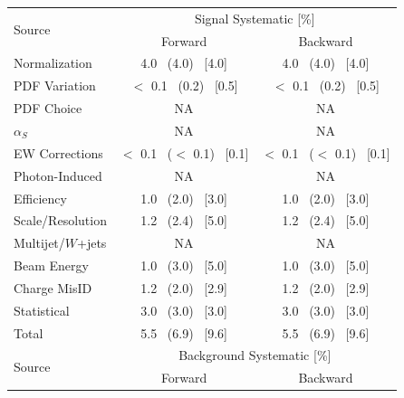     \begin {table}[h]
        \begin{center}
        \begin{tabular}{ | l | c c | } 
            \hline
            \multirow{2}{*}{Source} & \multicolumn{2}{c|}{Signal Systematic [\%]}               \\
                                & Forward                           & Backward                        \\
            \hline
            Normalization       & 4.0 ~(4.0) ~[4.0]           & 4.0 ~(4.0) ~[4.0]         \\
            PDF Variation       & $<$ 0.1 ~(0.2) ~[0.5]       & $<$ 0.1 ~(0.2) ~[0.5]     \\
            PDF Choice          & NA                                & NA                              \\
            $\alpha_S$          & NA                                & NA                              \\
            EW Corrections      & $<$ 0.1 ~($<$ 0.1) ~[0.1]   & $<$ 0.1 ~($<$ 0.1) ~[0.1] \\
            Photon-Induced      & NA                                & NA                              \\
            Efficiency          & 1.0 ~(2.0) ~[3.0]           & 1.0 ~(2.0) ~[3.0]         \\
            Scale/Resolution    & 1.2 ~(2.4) ~[5.0]           & 1.2 ~(2.4) ~[5.0]         \\
            Multijet/$W$+jets  & NA                                & NA                              \\
            Beam Energy         & 1.0 ~(3.0) ~[5.0]           & 1.0 ~(3.0) ~[5.0]         \\
            Charge MisID        & 1.2 ~(2.0) ~[2.9]           &  1.2 ~(2.0) ~[2.9]        \\
            Statistical         & 3.0 ~(3.0) ~[3.0]           & 3.0 ~(3.0) ~[3.0]         \\
            \hline  
            Total               & 5.5 ~(6.9) ~[9.6]             & 5.5 ~(6.9) ~[9.6]        \\
            \hline
            \hline
            \multirow{2}{*}{Source} & \multicolumn{2}{c|}{Background Systematic [\%]}          \\
                                & Forward                           & Backward                      \\

\end{tabular}
\end{center}
\end{table}
